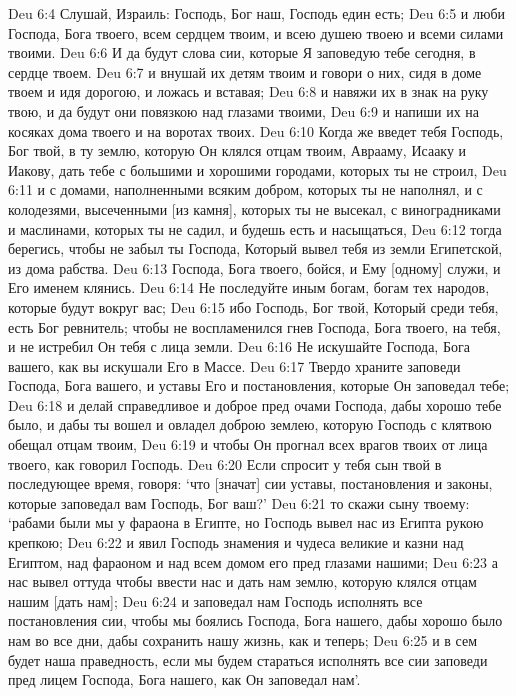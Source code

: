 Deu 6:4  Слушай, Израиль: Господь, Бог наш, Господь един есть;
Deu 6:5  и люби Господа, Бога твоего, всем сердцем твоим, и всею душею твоею и всеми силами твоими.
Deu 6:6  И да будут слова сии, которые Я заповедую тебе сегодня, в сердце твоем.
Deu 6:7  и внушай их детям твоим и говори о них, сидя в доме твоем и идя дорогою, и ложась и вставая;
Deu 6:8  и навяжи их в знак на руку твою, и да будут они повязкою над глазами твоими,
Deu 6:9  и напиши их на косяках дома твоего и на воротах твоих.
Deu 6:10  Когда же введет тебя Господь, Бог твой, в ту землю, которую Он клялся отцам твоим, Аврааму, Исааку и Иакову, дать тебе с большими и хорошими городами, которых ты не строил,
Deu 6:11  и с домами, наполненными всяким добром, которых ты не наполнял, и с колодезями, высеченными [из камня], которых ты не высекал, с виноградниками и маслинами, которых ты не садил, и будешь есть и насыщаться,
Deu 6:12  тогда берегись, чтобы не забыл ты Господа, Который вывел тебя из земли Египетской, из дома рабства.
Deu 6:13  Господа, Бога твоего, бойся, и Ему [одному] служи, и Его именем клянись.
Deu 6:14  Не последуйте иным богам, богам тех народов, которые будут вокруг вас;
Deu 6:15  ибо Господь, Бог твой, Который среди тебя, есть Бог ревнитель; чтобы не воспламенился гнев Господа, Бога твоего, на тебя, и не истребил Он тебя с лица земли.
Deu 6:16  Не искушайте Господа, Бога вашего, как вы искушали Его в Массе.
Deu 6:17  Твердо храните заповеди Господа, Бога вашего, и уставы Его и постановления, которые Он заповедал тебе;
Deu 6:18  и делай справедливое и доброе пред очами Господа, дабы хорошо тебе было, и дабы ты вошел и овладел доброю землею, которую Господь с клятвою обещал отцам твоим,
Deu 6:19  и чтобы Он прогнал всех врагов твоих от лица твоего, как говорил Господь.
Deu 6:20  Если спросит у тебя сын твой в последующее время, говоря: `что [значат] сии уставы, постановления и законы, которые заповедал вам Господь, Бог ваш?'
Deu 6:21  то скажи сыну твоему: `рабами были мы у фараона в Египте, но Господь вывел нас из Египта рукою крепкою;
Deu 6:22  и явил Господь знамения и чудеса великие и казни над Египтом, над фараоном и над всем домом его пред глазами нашими;
Deu 6:23  а нас вывел оттуда чтобы ввести нас и дать нам землю, которую клялся отцам нашим [дать нам];
Deu 6:24  и заповедал нам Господь исполнять все постановления сии, чтобы мы боялись Господа, Бога нашего, дабы хорошо было нам во все дни, дабы сохранить нашу жизнь, как и теперь;
Deu 6:25  и в сем будет наша праведность, если мы будем стараться исполнять все сии заповеди пред лицем Господа, Бога нашего, как Он заповедал нам'.
